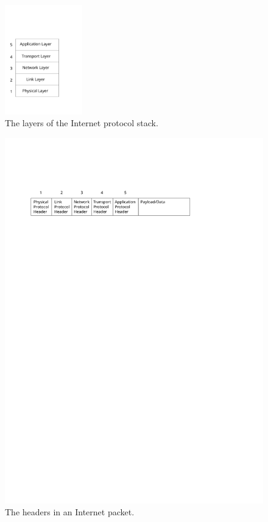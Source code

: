\documentclass[a4paper,
		12pt,
		parskip=full,
		titlepage
		]{scrartcl}
\begin{document}
\begin{figure}
\centering
\includegraphics[width=0.3\textwidth]{images/internet-layers}
\caption{The layers of the Internet protocol stack.}
\label{fig:layermodel}
\end{figure}

\begin{figure}
\centering
\includegraphics[width=\textwidth]{images/packet-headers}
\caption{The headers in an Internet packet.}
\label{fig:packet-headers}
\end{figure}
\end{document}
